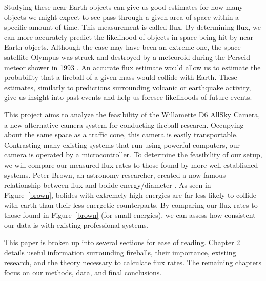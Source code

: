Studying these near-Earth objects can give us good estimates for how many objects we might expect to see pass through a given area of space within a specific amount of time.
This measurement is called flux.
By determining flux, we can more accurately predict the likelihood of objects in space being hit by near-Earth objects. 
Although the case may have been an extreme one, the space satellite Olympus was struck and destroyed by a meteoroid during the Perseid meteor shower in 1993 \cite{bobrowsky_comet/asteroid_nodate}.
An accurate flux estimate would allow us to estimate the probability that a fireball of a given mass would collide with Earth.
These estimates, similarly to predictions surrounding volcanic or earthquake activity, give us insight into past events and help us foresee likelihoods of future events.

This project aims to analyze the feasibility of the Willamette D6 AllSky Camera, a new alternative camera system for conducting fireball research. 
Occupying about the same space as a traffic cone, this camera is easily transportable.
Contrasting many existing systems that run using powerful computers, our camera is operated by a microcontroller.
To determine the feasibility of our setup, we will compare our measured flux rates to those found by more well-established systems.
Peter Brown, an astronomy researcher, created a now-famous relationship between flux and bolide energy/diameter \cite{brown_p_flux_2002}.
As seen in Figure~\ref{brown}, bolides with extremely high energies are far less likely to collide with earth than their less energetic counterparts.
By comparing our flux rates to those found in Figure~\ref{brown} (for small energies), we can assess how consistent our data is with existing professional systems.

This paper is broken up into several sections for ease of reading. Chapter 2 details useful information surrounding fireballs, their importance, existing research, and the theory necessary to calculate flux rates. 
The remaining chapters focus on our methods, data, and final conclusions.   
